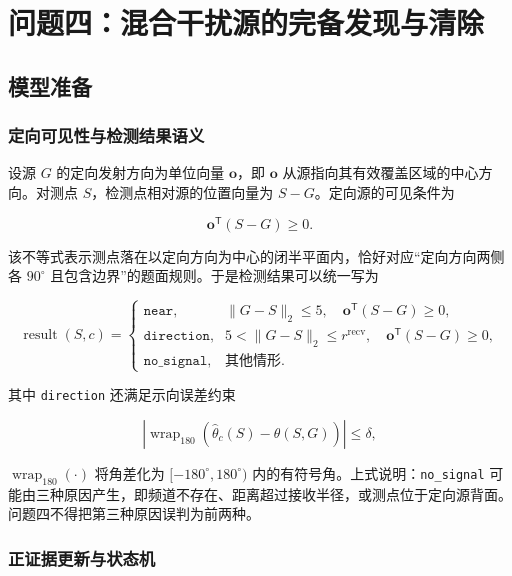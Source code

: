 \section{问题四：混合干扰源的完备发现与清除}

\subsection{模型准备}

\subsubsection{定向可见性与检测结果语义}

设源 $G$ 的定向发射方向为单位向量 $\boldsymbol o$，即 $\boldsymbol o$ 从源指向其有效覆盖区域的中心方向。对测点 $S$，检测点相对源的位置向量为 $S-G$。定向源的可见条件为

\begin{equation}
\boldsymbol o^{\mathsf T}(S-G)\ge0.
\label{eq:q4_visibility}
\end{equation}

该不等式表示测点落在以定向方向为中心的闭半平面内，恰好对应“定向方向两侧各 $90^\circ$ 且包含边界”的题面规则。于是检测结果可以统一写为

\begin{equation}
\operatorname{result}(S,c)=
\begin{cases}
\texttt{near},&
\lVert G-S\rVert_2\le5,\quad \boldsymbol o^{\mathsf T}(S-G)\ge0,\\[2mm]
\texttt{direction},&
5<\lVert G-S\rVert_2\le r^{\mathrm{recv}},\quad
\boldsymbol o^{\mathsf T}(S-G)\ge0,\\[2mm]
\texttt{no\_signal},&
\text{其他情形}.
\end{cases}
\label{eq:q4_measure_semantics}
\end{equation}

其中 \texttt{direction} 还满足示向误差约束

\begin{equation}
\left|\operatorname{wrap}_{180}(\hat\theta_c(S)-\theta(S,G))\right|\le\delta,
\label{eq:q4_bearing_error}
\end{equation}

$\operatorname{wrap}_{180}(\cdot)$ 将角差化为 $[-180^\circ,180^\circ)$ 内的有符号角。上式说明：\texttt{no\_signal} 可能由三种原因产生，即频道不存在、距离超过接收半径，或测点位于定向源背面。问题四不得把第三种原因误判为前两种。

\subsubsection{正证据更新与状态机}

